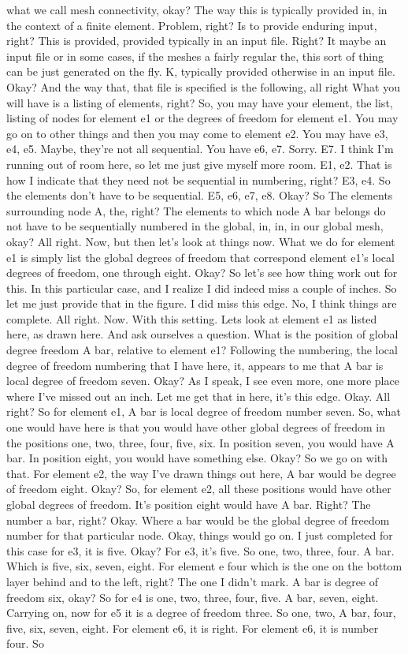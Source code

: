 \documentclass[10pt]{article}
\begin{document}
what we call mesh connectivity, okay? The way this is typically provided in, in the context of a finite element. Problem, right? Is to provide enduring input, right? This is provided, provided typically in an input file.  Right? It maybe an input file or in some cases, if the meshes a fairly regular the, this sort of thing can be just generated on the fly. K, typically provided otherwise in an input file. Okay? And the way that, that file is specified is the following, all right What you will have is a listing of elements, right? So, you may have your element, the list, listing of nodes for element e1 or the degrees of freedom for element e1. You may go on to other things and then you may come to element e2. You may have e3, e4, e5. Maybe, they're not all sequential. You have e6, e7. Sorry. E7. I think I'm running out of room here, so let me just give myself more room. E1, e2. That is how I indicate that they need not be sequential in numbering, right? E3, e4. So the elements don't have to be sequential. E5, e6, e7, e8. Okay? So The elements surrounding node A, the, right? The elements to which node A bar belongs do not have to be sequentially numbered in the global, in, in, in our global mesh, okay? All right. Now, but then let's look at things now. What we do for element e1 is simply list the global degrees of freedom that correspond element e1's local degrees of freedom, one through eight. Okay? So let's see how thing work out for this. In this particular case, and I realize I did indeed miss a couple of inches. So let me just provide that in the figure. I did miss this edge. No, I think things are complete. All right. Now. With this setting. Lets look at element e1 as listed here, as drawn here. And ask ourselves a question. What is the position of global degree freedom A bar, relative to element e1? Following the numbering, the local degree of freedom numbering that I have here, it, appears to me that A bar is local degree of freedom seven. Okay? As I speak, I see even more, one more place where I've missed out an inch. Let me get that in here, it's this edge. Okay. All right? So for element e1, A bar is local degree of freedom number seven. So, what one would have here is that you would have other global degrees of freedom in the positions one, two, three, four, five, six. In position seven, you would have A bar. In position eight, you would have something else. Okay? So we go on with that. For element e2, the way I've drawn things out here, A bar would be degree of freedom eight. Okay? So, for element e2, all these positions would have other global degrees of freedom. It's position eight would have A bar. Right? The number a bar, right? Okay. Where a bar would be the global degree of freedom number for that particular node. Okay, things would go on. I just completed for this case for e3, it is five. Okay? For e3, it's five. So one, two, three, four. A bar. Which is five, six, seven, eight. For element e four which is the one on the bottom layer behind and to the left, right? The one I didn't mark. A bar is degree of freedom six, okay? So for e4 is one, two, three, four, five. A bar, seven, eight. Carrying on, now for e5 it is a degree of freedom three. So one, two, A bar, four, five, six, seven, eight. For element e6, it is right. For element e6, it is number four. So 
\end{document}
